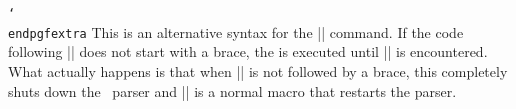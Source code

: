 \begin{command}{\pgfextra {} \texttt{\char`\\endpgfextra}}
  This is an alternative syntax for the |\pgfextra| command. If the
  code following |\pgfextra| does not start with a brace, the
   is executed until |\endpgfextra| is encountered. What
  actually happens is that when |\pgfextra| is not followed by a
  brace, this completely shuts down the \tikzname\ parser and
  |\endpgfextra| is a normal macro that restarts the parser.

\begin{codeexample}[]
\newdimen\mydim
\begin{tikzpicture}
  \mydim=1cm
  \draw (0pt,\mydim)
    \pgfextra \mydim=2cm \endpgfextra -- (0pt,\mydim);
\end{tikzpicture}
\end{codeexample}
\end{command}
